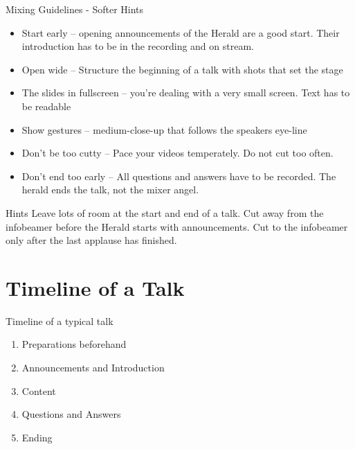 \documentclass[aspectratio=169]{beamer}
\begin{document}
\begin{frame}{Mixing Guidelines - Softer Hints}
	\begin{itemize}
		\item Start early – opening announcements of the Herald are a good start. Their introduction has to be in the recording and on stream.
		\item Open wide – Structure the beginning of a talk with shots that set the stage
		\item The slides in fullscreen – you’re dealing with a very small screen. Text has to be readable
		\item Show gestures – medium-close-up that follows the speakers eye-line
		\item Don’t be too cutty – Pace your videos temperately. Do not cut too often.
		\item Don't end too early – All questions and answers have to be recorded. The herald ends the talk, not the mixer angel.
	\end{itemize}
	\begin{exampleblock}{Hints}
		Leave lots of room at the start and end of a talk. 
		Cut away from the infobeamer before the Herald starts with announcements. 
		Cut to the infobeamer only after the last applause has finished.
	\end{exampleblock}
\end{frame}

\section{Timeline of a Talk}

\begin{frame}{Timeline of a typical talk}
	\begin{enumerate}
		\item Preparations beforehand
		\item Announcements and Introduction
		\item Content
		\item Questions and Answers
		\item Ending
	\end{enumerate}
\end{frame}
\end{document}
